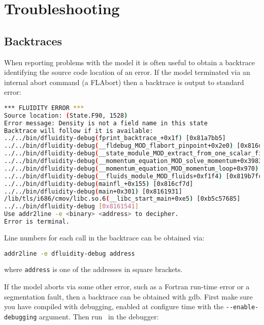 \chapter{Troubleshooting}

\section{Backtraces}

When reporting problems with the model it is often useful to obtain a backtrace
identifying the source code location of
an error. If the model terminated via an internal abort command (a FLAbort) then a backtrace
is output to standard error:

\begin{lstlisting}[language = Bash]
*** FLUIDITY ERROR ***
Source location: (State.F90, 1528)
Error message: Density is not a field name in this state
Backtrace will follow if it is available:
../../bin/dfluidity-debug(fprint_backtrace_+0x1f) [0x81a7bb5]
../../bin/dfluidity-debug(__fldebug_MOD_flabort_pinpoint+0x2e0) [0x816d575]
../../bin/dfluidity-debug(__state_module_MOD_extract_from_one_scalar_field+0xb23) [0x822448f]
../../bin/dfluidity-debug(__momentum_equation_MOD_solve_momentum+0x3983) [0x8779c1c]
../../bin/dfluidity-debug(__momentum_equation_MOD_momentum_loop+0x970) [0x8785bdc]
../../bin/dfluidity-debug(__fluids_module_MOD_fluids+0xf1f4) [0x819b7fc]
../../bin/dfluidity-debug(mainfl_+0x155) [0x816cf7d]
../../bin/dfluidity-debug(main+0x301) [0x8161931]
/lib/tls/i686/cmov/libc.so.6(__libc_start_main+0xe5) [0xb5c57685]
../../bin/dfluidity-debug [0x8161541]
Use addr2line -e <binary> <address> to decipher.
Error is terminal.
\end{lstlisting}

Line numbers for each call in the backtrace can be obtained via:

\begin{lstlisting}[language = Bash]
addr2line -e dfluidity-debug address
\end{lstlisting}

where \lstinline[language = Bash]*address* is one of the addresses in square
brackets.

If the model aborts via some other error, such as a Fortran run-time error or
a segmentation fault, then a backtrace can be obtained with gdb. First make
sure you have compiled with debugging, enabled at configure time with the
\lstinline[language = Bash]*--enable-debugging* argument. Then run
\fluidity\ in the debugger:

